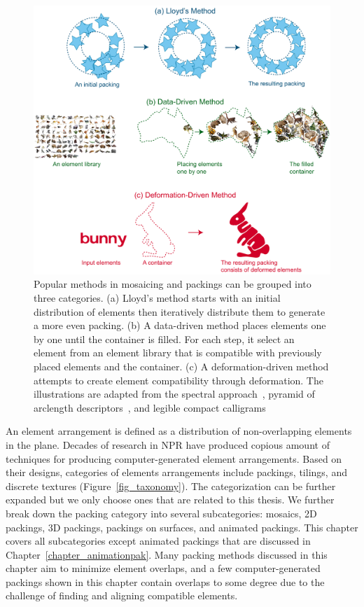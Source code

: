 \begin{figure}
\centering
\includegraphics[width=1.0\textwidth]{figures/related/taxonomy_method.pdf} 
\caption[A classification of packing methods]
{\label{fig_taxonomy_method} 
\nnewtext
{
Popular methods in mosaicing and packings can be grouped into three categories.
(a) Lloyd's method starts with an initial distribution of elements then iteratively distribute them
to generate a more even packing. 
(b) A data-driven method places elements one by one until the container is filled.
For each step, it select an element from an element library that is compatible with previously placed elements and the container.
(c) A deformation-driven method attempts to create element compatibility through deformation.
The illustrations are adapted from the spectral approach~\cite{Dalal2006}, 
pyramid of arclength descriptors~\cite{Kwan2016}, and
legible compact calligrams~\cite{Zou2016}
}
}
\end{figure}

\nnewtext
{
An element arrangement is defined as a distribution of non-overlapping elements in the plane.
Decades of research in NPR have produced copious amount of techniques for producing computer-generated element arrangements.
Based on their designs, categories of elements arrangements include
packings, tilings, and discrete textures (Figure~\ref{fig_taxonomy}).
The categorization can be further expanded but we only choose ones that are related to this thesis.
We further break down the packing category into several subcategories: mosaics, 2D packings, 3D packings, 
packings on surfaces, and animated packings.
This chapter covers all subcategories except animated packings that are discussed in Chapter~\ref{chapter_animationpak}. 
Many packing methods discussed in this chapter aim to minimize element overlaps, and
a few computer-generated packings shown in this chapter 
contain overlaps to some degree due to the challenge of finding and aligning compatible elements.
}

